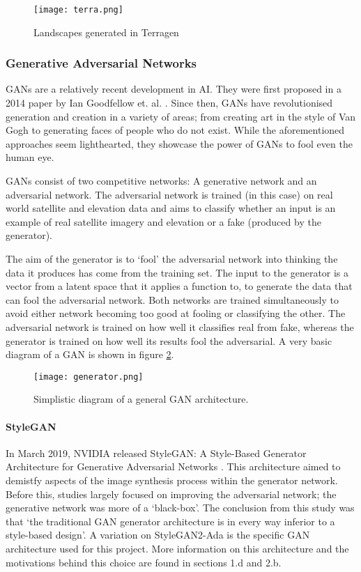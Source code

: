 \documentclass[a4paper]{report}
\begin{document}
\begin{figure}[H]
    \centering
        \texttt{[image: terra.png]}
        \caption{Landscapes generated in Terragen}
        \label{fig:terra}
\end{figure}

\subsubsection{Generative Adversarial Networks}
GANs are a relatively recent development in AI. They were first proposed in a 2014 paper by Ian Goodfellow et. al. \cite{goodfellow2014generative}. Since then, GANs have revolutionised generation and creation in a variety of areas; from creating art in the style of Van Gogh \cite{gangogh} to generating faces of people who do not exist\cite{persondoesnotexist}. While the aforementioned approaches seem lighthearted, they showcase the power of GANs to fool even the human eye.

GANs consist of two competitive networks: A generative network and an adversarial network. The adversarial network is trained (in this case) on real world satellite and elevation data and aims to classify whether an input is an example of real satellite imagery and elevation or a fake (produced by the generator).

The aim of the generator is to `fool' the adversarial network into thinking the data it produces has come from the training set. The input to the generator is a vector from a latent space that it applies a function to, to generate the data that can fool the adversarial network. Both networks are trained simultaneously to avoid either network becoming too good at fooling or classifying the other. The adversarial network is trained on how well it classifies real from fake, whereas the generator is trained on how well its results fool the adversarial. A very basic diagram of a GAN is shown in figure \ref{fig:gan}.

\begin{figure}[H]
    \centering
        \texttt{[image: generator.png]}
        \caption{Simplistic diagram of a general GAN architecture.}
        \label{fig:gan}
\end{figure}

\paragraph{StyleGAN}
In March 2019, NVIDIA released StyleGAN: A Style-Based Generator Architecture for Generative Adversarial Networks \cite{stylegan}. This architecture aimed to demistfy aspects of the image synthesis process within the generator network. Before this, studies largely focused on improving the adversarial network; the generative network was more of a `black-box'. The conclusion from this study was that `the traditional GAN generator architecture is in every way inferior to a style-based design'. A variation on StyleGAN2-Ada \cite{stylegan2} is the specific GAN architecture used for this project. More information on this architecture and the motivations behind this choice are found in sections 1.d and 2.b.
\end{document}
